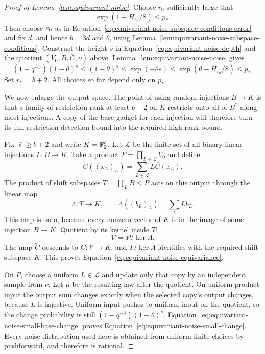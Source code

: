 \begin{proof}[Proof of Lemma~\ref{lem:equivariant-noise}]
Choose $r_0$ sufficiently large that
\[
 \exp(1-H_{r_0}/8)\le p_*.
\]
Then choose $\varepsilon_0$ as in Equation~\eqref{eq:equivariant-noise-subspace-conditions-error} and
fix $d$, and hence $b=3d$ and $\theta$, using
Lemma~\ref{lem:equivariant-noise-subspace-conditions}.  Construct the height $s$ in
Equation~\eqref{eq:equivariant-noise-depth} and the quotient $(V_0,B,\overline C,\nu)$
above.  Lemma~\ref{lem:equivariant-noise-noise} gives
\begin{equation}\label{eq:equivariant-noise-small-base-change}
 (1-q^{-3})(1-\theta)^s\le(1-\theta)^s
 \le\exp(-\theta s)
 \le\exp(\theta-H_{r_0}/8)
 \le p_*.
\end{equation}
Set $r_*=b+2$.  All choices so far depend only on $p_*$.

We now enlarge the output space.  The point of using random injections
$B\to K$ is that a family of restriction rank at least $b+2$ on $K$
restricts onto all of $B^*$ along most injections.  A copy of the base
gadget for each injection will therefore turn its full-restriction
detection bound into the required high-rank bound.

Fix $\ell\ge b+2$ and write $K=\mathbb F_2^\ell$.
Let $\mathcal L$ be the finite set of all binary linear injections
$L:B\to K$.  Take a product $P=\prod_{L\in\mathcal L}V_0$ and define
\[
 \widetilde C((x_L)_L)=\sum_{L\in\mathcal L}L\overline C(x_L).
\]
The product of shift subspaces $T=\prod_L B\le P$ acts on this output
through the linear map
\[
 \Lambda:T\longrightarrow K,
 \qquad \Lambda((b_L)_L)=\sum_L Lb_L.
\]
This map is onto, because every nonzero vector of $K$ is in the image of
some injection $B\to K$.  Quotient by its kernel inside $T$:
\[
 \mathcal V=P/\ker\Lambda.
\]
The map $\widetilde C$ descends to $C:\mathcal V\to K$, and
$T/\ker\Lambda$ identifies with the required shift subspace $K$.
This proves Equation~\eqref{eq:equivariant-noise-equivariance}.

On $P$, choose a uniform $L\in\mathcal L$ and update only that copy by
an independent sample from $\nu$.  Let $\mu$ be the resulting law after
the quotient.  On uniform product input the output sum changes exactly
when the selected copy's output changes, because $L$ is injective.
Uniform input pushes to uniform input on the quotient, so the change
probability is still $(1-q^{-3})(1-\theta)^s$.  Equation~\eqref{eq:equivariant-noise-small-base-change}
proves Equation~\eqref{eq:equivariant-noise-small-change}.  Every noise distribution
used here is obtained from uniform finite choices by pushforward, and
therefore is rational.


\end{proof}
